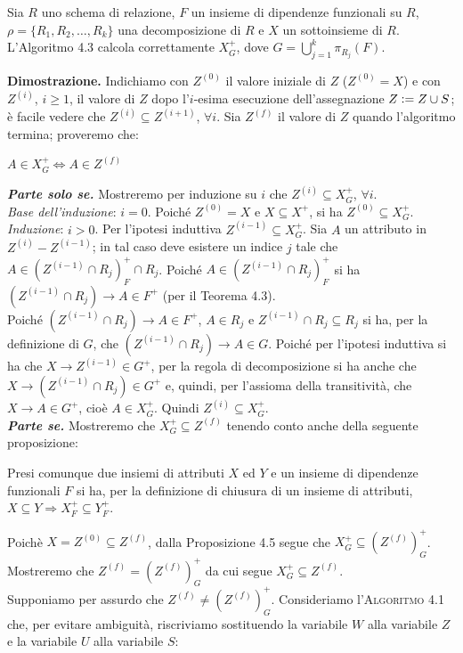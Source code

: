 \begin{theo}
Sia $R$ uno schema di relazione, $F$ un insieme di dipendenze funzionali su $R$, $\rho =\{R_1, R_2, \ldots, R_k\}$
una decomposizione di $R$ e $X$ un sottoinsieme di $R$. L'Algoritmo 4.3 calcola correttamente $X^{+}_G$, dove 
$G = \bigcup_{j=1}^k \pi_{R_j}(F)$.
\end{theo}
\textbf{Dimostrazione.} Indichiamo con $Z^{(0)}$ il valore iniziale di $Z$ ($Z^{(0)} = X$) e con $Z^{(i)}$, $i \geq 
1$, il valore di $Z$ dopo l'$i$-esima esecuzione dell'assegnazione $Z \vcentcolon= Z \cup S$; è facile vedere che 
$Z^{(i)} \subseteq Z^{(i+1)}$, $\forall i$. Sia $Z^{(f)}$ il valore di $Z$ quando l'algoritmo termina; proveremo che:
\begin{center}
\begin{math}
  A \in X^{+}_G \Leftrightarrow  A \in Z^{(f)} 
\end{math}
\end{center}
\textbf{\emph{Parte solo se.}} Mostreremo per induzione su $i$ che $Z^{(i)} \subseteq X^{+}_G$, $\forall i$.\\
\emph{Base dell'induzione}: $i=0$. Poiché $Z^{(0)} = X$ e $X \subseteq X^+$, si ha $Z^{(0)} \subseteq X^{+}_G$.\\
\emph{Induzione}: $i >0$. Per l'ipotesi induttiva $Z^{(i-1)} \subseteq X^{+}_G$. Sia $A$ un attributo in $Z^{(i)}
-Z^{(i-1)}$; in tal caso deve esistere un indice $j$ tale che $A \in (Z^{(i-1)} \cap R_j)^{+}_F \cap R_j$. Poiché
$A \in (Z^{(i-1)} \cap R_j)^{+}_F$ si ha $(Z^{(i-1)} \cap R_j) \rightarrow A \in F^+$ (per il Teorema 4.3).\\
Poiché $(Z^{(i-1)} \cap R_j) \rightarrow A \in F^+$, $A \in R_j$ e $Z^{(i-1)} \cap R_j \subseteq R_j$ si ha, per 
la definizione di $G$, che $(Z^{(i-1)} \cap R_j) \rightarrow A \in G$. Poiché per l'ipotesi induttiva si ha che 
$X \rightarrow Z^{(i-1)} \in G^+$, per la regola di decomposizione si ha anche che $X \rightarrow (Z^{(i-1)} 
\cap R_j) \in G^+$ e, quindi, per l'assioma della transitività, che $X \rightarrow A \in G^+$, cioè $A \in X^{+}_G$.
Quindi $Z^{(i)} \subseteq X^{+}_G$.\\
\textbf{\emph{Parte se.}} Mostreremo che $X^{+}_G \subseteq Z^{(f)}$ tenendo conto anche della seguente proposizione:
\begin{prop}
Presi comunque due insiemi di attributi $X$ ed $Y$ e un insieme di dipendenze funzionali $F$ si ha, per la 
definizione di chiusura di un insieme di attributi, $X \subseteq Y \Rightarrow X^{+}_F \subseteq Y^{+}_F$. 
\end{prop}
Poichè $X = Z^{(0)} \subseteq Z^{(f)}$, dalla Proposizione 4.5 segue che $X^{+}_G \subseteq (Z^{(f)})^{+}_G$. 
Mostreremo che $Z^{(f)} = (Z^{(f)})^+_G$ da cui segue $X^+_G \subseteq Z^{(f)}.$\\
Supponiamo per assurdo che $Z^{(f)}\not =(Z^{(f)})^+_G$. Consideriamo l'\textsc{Algoritmo 4.1} che, per evitare ambiguità,
riscriviamo sostituendo la variabile $W$ alla variabile $Z$ e la variabile $U$ alla variabile $S$:\\

